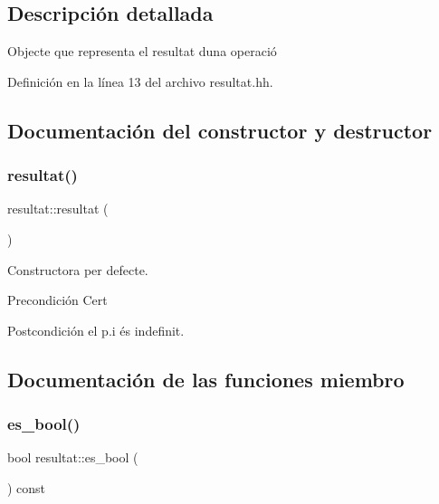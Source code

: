 \subsection{Descripción detallada}
Objecte que representa el resultat d\textquotesingle{}una operació 

Definición en la línea 13 del archivo resultat.\+hh.



\subsection{Documentación del constructor y destructor}
\hypertarget{classresultat_a536c47bd86857e3f5bfb26e156cb1877}{}\label{classresultat_a536c47bd86857e3f5bfb26e156cb1877} 
\subsubsection{\texorpdfstring{resultat()}{resultat()}}
{\footnotesize\ttfamily resultat\+::resultat (\begin{DoxyParamCaption}{ }\end{DoxyParamCaption})}



Constructora per defecte. 

\begin{DoxyPrecond}{Precondición}
Cert 
\end{DoxyPrecond}
\begin{DoxyPostcond}{Postcondición}
el p.\+i és indefinit. 
\end{DoxyPostcond}


\subsection{Documentación de las funciones miembro}
\hypertarget{classresultat_a3ed548d73663ca956ac2f087c400abe6}{}\label{classresultat_a3ed548d73663ca956ac2f087c400abe6} 
\subsubsection{\texorpdfstring{es\+\_\+bool()}{es\_bool()}}
{\footnotesize\ttfamily bool resultat\+::es\+\_\+bool (\begin{DoxyParamCaption}{ }\end{DoxyParamCaption}) const}



